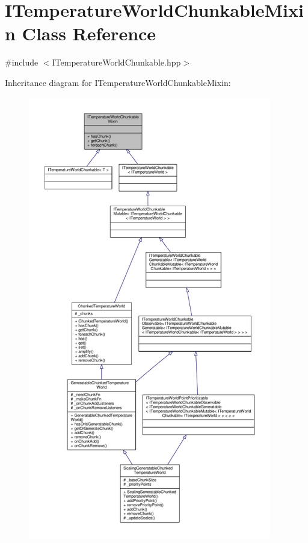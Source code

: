 \hypertarget{class_i_temperature_world_chunkable_mixin}{\section{I\-Temperature\-World\-Chunkable\-Mixin Class Reference}
\label{class_i_temperature_world_chunkable_mixin}
}


{\ttfamily \#include $<$I\-Temperature\-World\-Chunkable.\-hpp$>$}



Inheritance diagram for I\-Temperature\-World\-Chunkable\-Mixin\-:
\nopagebreak
\begin{figure}[H]
\begin{center}
\leavevmode
\includegraphics[height=550pt]{class_i_temperature_world_chunkable_mixin__inherit__graph}
\end{center}
\end{figure}


